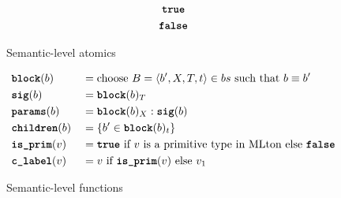\documentclass{article}
\newcommand{\bttt}[1]{\texttt{\textbf{#1}}}
\begin{document}
\begin{figure}[H]
  \centering
  \begin{gather*}
    \bttt{true} \\
    \bttt{false}
  \end{gather*}
  \caption{Semantic-level atomics}
\end{figure}

\begin{figure}[H]
  \centering
  \begin{alignat*}{2}
    &\bttt{block} (b)    &&= \text{choose } B = \langle b', X, T, t \rangle \in bs \text{ such that } b \equiv b' \\
    &\bttt{sig} (b)      &&= \bttt{block}(b)_T \\
    &\bttt{params} (b)   &&= \bttt{block}(b)_X : \bttt{sig}(b) \\
    &\bttt{children} (b) &&= \{ b' \in \bttt{block}(b)_t \} \\
    &\bttt{is\_prim} (v)  &&= \bttt{true} \text{ if } v \text{ is a primitive type in MLton else } \bttt{false} \\
    &\bttt{c\_label} (v)    &&= v \text{ if } \bttt{is\_prim} (v) \text{ else } v_1
  \end{alignat*}
  \caption{Semantic-level functions}
  \label{fig:semantic_fs}
\end{figure}
\end{document}
